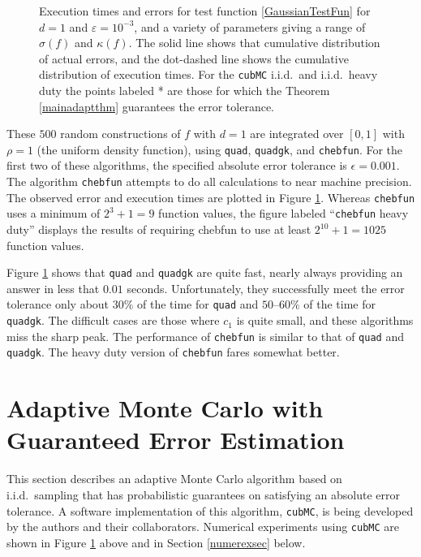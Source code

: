 \documentclass[graybox]{svmult}
\begin{document}
\begin{figure}
\caption{Execution times and errors for test function \eqref{GaussianTestFun} for $d=1$ and $\varepsilon=10^{-3}$, and a variety of parameters giving a range of $\sigma(f)$ and $\kappa(f)$. The solid line shows that cumulative distribution of actual errors, and the dot-dashed line shows the cumulative distribution of execution times.  For the {\tt cubMC} i.i.d.\ and i.i.d.\ heavy duty the points labeled * are those for which the Theorem \ref{mainadaptthm} guarantees the error tolerance.\label{GaussianTestFunFig} }
\end{figure}

These $500$ random constructions of $f$ with $d=1$ are integrated over $[0,1]$ with $\rho=1$ (the uniform density function), using {\tt quad},  {\tt quadgk}, and {\tt chebfun}.  For the first two of these algorithms, the specified absolute error tolerance is $\epsilon=0.001$.  The algorithm {\tt chebfun} attempts to do all calculations to near machine precision.  The observed error and execution times are plotted in Figure \ref{GaussianTestFunFig}.  Whereas {\tt chebfun} uses a minimum of $2^3+1=9$ function values, the figure labeled ``{\tt chebfun} heavy duty'' displays the results of requiring chebfun to use at least $2^{10}+1=1025$ function values.  

Figure \ref{GaussianTestFunFig} shows that {\tt quad} and {\tt quadgk} are quite fast, nearly always providing an answer in less that $0.01$ seconds.  Unfortunately, they successfully meet the error tolerance only about $30\%$ of the time for {\tt quad} and $50$--$60\%$ of the time for {\tt quadgk}.  The difficult cases are those where $c_1$ is quite small, and these algorithms miss the sharp peak.  The performance of {\tt chebfun} is similar to that of {\tt quad} and {\tt quadgk}.  The heavy duty version of  {\tt chebfun} fares somewhat better.  

\section{Adaptive Monte Carlo with Guaranteed Error Estimation}

This section describes an adaptive Monte Carlo algorithm based on i.i.d.\ sampling that has probabilistic guarantees on satisfying an absolute error tolerance.  A software implementation of this algorithm, {\tt cubMC}, is being developed by the authors and their collaborators.  Numerical experiments using {\tt cubMC} are shown in Figure \ref{GaussianTestFunFig} above and in Section \ref{numerexsec} below.
\end{document}
